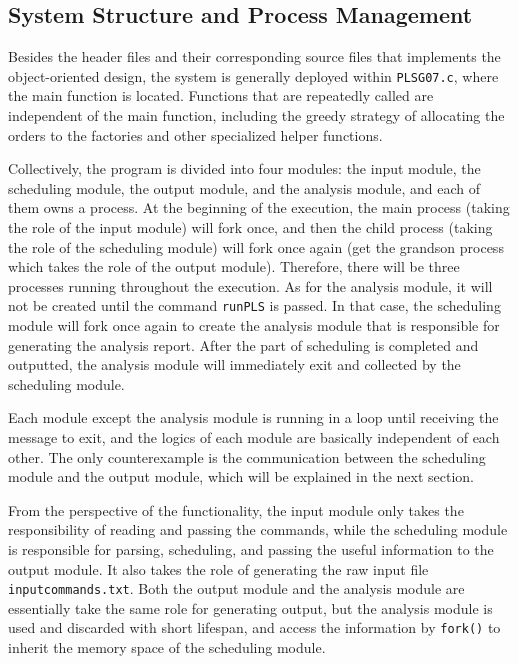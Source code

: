 \documentclass[a4paper, 12pt]{article}
\begin{document}
\subsection{System Structure and Process Management}

Besides the header files and their corresponding source files that implements the object-oriented design, the system is generally deployed within \texttt{PLS\textunderscore G07.c}, where the main function is located.
Functions that are repeatedly called are independent of the main function, including the greedy strategy of allocating the orders to the factories and other specialized helper functions. 

Collectively, the program is divided into four modules: the input module, the scheduling module, the output module, and the analysis module, and each of them owns a process. 
At the beginning of the execution, the main process (taking the role of the input module) will fork once, and then the child process (taking the role of the scheduling module) will fork once again (get the grandson process which takes the role of the output module).
Therefore, there will be three processes running throughout the execution. 
As for the analysis module, it will not be created until the command \texttt{runPLS} is passed. In that case, the scheduling module will fork once again to create the analysis module that is responsible for generating the analysis report.
After the part of scheduling is completed and outputted, the analysis module will immediately exit and collected by the scheduling module.

Each module except the analysis module is running in a loop until receiving the message to exit, and the logics of each module are basically independent of each other. 
The only counterexample is the communication between the scheduling module and the output module, which will be explained in the next section.

From the perspective of the functionality, the input module only takes the responsibility of reading and passing the commands,
while the scheduling module is responsible for parsing, scheduling, and passing the useful information to the output module.
It also takes the role of generating the raw input file \texttt{input\textunderscore commands.txt}.
Both the output module and the analysis module are essentially take the same role for generating output, but the analysis module is used and discarded with short lifespan,
and access the information by \texttt{fork()} to inherit the memory space of the scheduling module.
\end{document}
